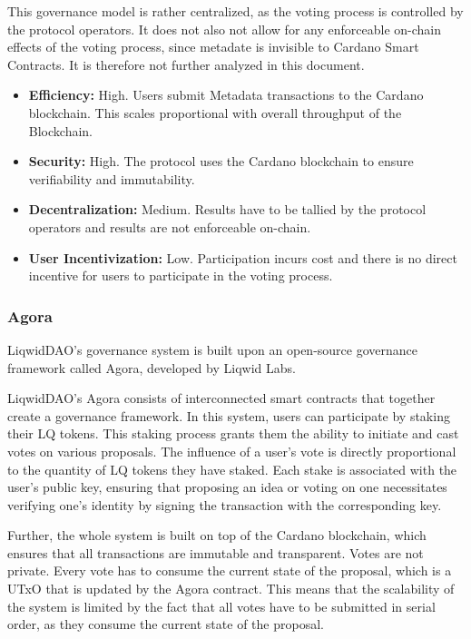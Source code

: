 \documentclass[11pt]{article}
\begin{document}
This governance model is rather centralized, as the voting process is controlled by the protocol operators.
It does not also not allow for any enforceable on-chain effects of the voting process,
since metadate is invisible to Cardano Smart Contracts.
It is therefore not further analyzed in this document.

\begin{itemize}
    \item \textbf{Efficiency:} High. Users submit Metadata transactions to the Cardano blockchain. This scales proportional with overall throughput of the Blockchain.
    \item \textbf{Security:} High. The protocol uses the Cardano blockchain to ensure verifiability and immutability.
    \item \textbf{Decentralization:} Medium. Results have to be tallied by the protocol operators and results are not enforceable on-chain.
    \item \textbf{User Incentivization:} Low. Participation incurs cost and there is no direct incentive for users to participate in the voting process.
\end{itemize}

\subsubsection{Agora}
LiqwidDAO's governance system is built upon an open-source governance framework called Agora\cite{liqwidagora}, developed by Liqwid Labs.

LiqwidDAO's Agora consists of interconnected smart contracts that together create a governance framework.
In this system, users can participate by staking their LQ tokens.
This staking process grants them the ability to initiate and cast votes on various proposals.
The influence of a user's vote is directly proportional to the quantity of LQ tokens they have staked.
Each stake is associated with the user's public key, ensuring that proposing an idea or voting on one necessitates verifying one's identity by signing the transaction with the corresponding key.

Further, the whole system is built on top of the Cardano blockchain, which ensures that all transactions are immutable and transparent.
Votes are not private.
Every vote has to consume the current state of the proposal, which is a UTxO that is updated by the Agora contract.
This means that the scalability of the system is limited by the fact that all votes have to be submitted in serial order, as they consume the current state of the proposal.
\end{document}
